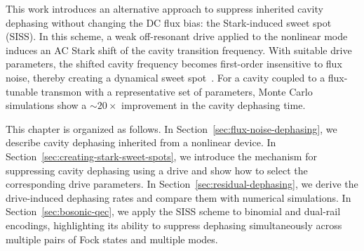 This work introduces an alternative approach to suppress inherited cavity dephasing without changing the DC flux bias: the Stark-induced sweet spot (SISS). In this scheme, a weak off-resonant drive applied to the nonlinear mode induces an AC Stark shift of the cavity transition frequency. With suitable drive parameters, the shifted cavity frequency becomes first-order insensitive to flux noise, thereby creating a dynamical sweet spot~\cite{Huang2021DynamicalSweetSpots,PhysRevApplied.12.054015dss2}. For a cavity coupled to a flux-tunable transmon with a representative set of parameters, Monte Carlo simulations show a \(\sim 20\times\) improvement in the cavity dephasing time.

This chapter is organized as follows. In Section~\ref{sec:flux-noise-dephasing}, we describe cavity dephasing inherited from a nonlinear device. In Section~\ref{sec:creating-stark-sweet-spots}, we introduce the mechanism for suppressing cavity dephasing using a drive and show how to select the corresponding drive parameters. In Section~\ref{sec:residual-dephasing}, we derive the drive-induced dephasing rates and compare them with numerical simulations. In Section~\ref{sec:bosonic-qec}, we apply the SISS scheme to binomial and dual-rail encodings, highlighting its ability to suppress dephasing simultaneously across multiple pairs of Fock states and multiple modes. 

